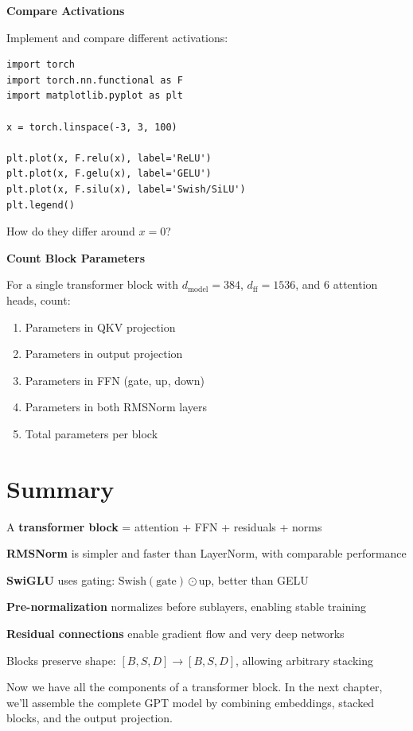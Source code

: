 \begin{exercise}
\textbf{Compare Activations}

Implement and compare different activations:
\begin{lstlisting}[style=python, numbers=none]
import torch
import torch.nn.functional as F
import matplotlib.pyplot as plt

x = torch.linspace(-3, 3, 100)

plt.plot(x, F.relu(x), label='ReLU')
plt.plot(x, F.gelu(x), label='GELU')
plt.plot(x, F.silu(x), label='Swish/SiLU')
plt.legend()
\end{lstlisting}

How do they differ around $x = 0$?
\end{exercise}

\begin{exercise}
\textbf{Count Block Parameters}

For a single transformer block with $d_{\text{model}} = 384$, $d_{\text{ff}} = 1536$, and 6 attention heads, count:
\begin{enumerate}
    \item Parameters in QKV projection
    \item Parameters in output projection
    \item Parameters in FFN (gate, up, down)
    \item Parameters in both RMSNorm layers
    \item Total parameters per block
\end{enumerate}
\end{exercise}

\section{Summary}

\begin{summary}
    \item A \textbf{transformer block} = attention + FFN + residuals + norms
    \item \textbf{RMSNorm} is simpler and faster than LayerNorm, with comparable performance
    \item \textbf{SwiGLU} uses gating: $\text{Swish}(\text{gate}) \odot \text{up}$, better than GELU
    \item \textbf{Pre-normalization} normalizes before sublayers, enabling stable training
    \item \textbf{Residual connections} enable gradient flow and very deep networks
    \item Blocks preserve shape: $[B, S, D] \to [B, S, D]$, allowing arbitrary stacking
\end{summary}

Now we have all the components of a transformer block. In the next chapter, we'll assemble the complete GPT model by combining embeddings, stacked blocks, and the output projection.
